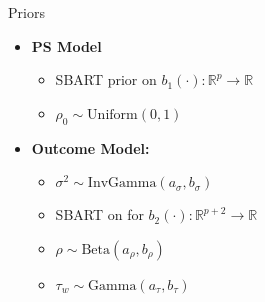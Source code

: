 \documentclass{beamer}
\begin{document}
\begin{frame}{Priors}
    \begin{itemize}
      \vfill  \item \textbf{ PS Model}
      \begin{itemize}
          \vfill \item  SBART prior on $b_1(\cdot): \mathbb{R}^{p}\to \mathbb{R}$
          \vfill \item $\rho_0 \sim \text{Uniform}(0,1)$

      \end{itemize}
        \vfill  \item \textbf{ Outcome Model:}
     \begin{itemize}
        \vfill \item $\sigma^2 \sim \text{InvGamma}(a_\sigma, b_\sigma)$
        \vfill \item SBART on for $b_2(\cdot): \mathbb{R}^{p+2}\to \mathbb{R}$
        \vfill \item  $\rho \sim \text{Beta}(a_\rho,b_\rho)$
        \vfill \item   $\tau_w \sim \text{Gamma}(a_\tau, b_\tau)$
     \end{itemize}
    \end{itemize}
\end{frame}


    
\end{document}

